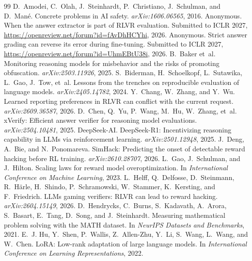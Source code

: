 \documentclass[10pt]{article}
\begin{document}
\begin{thebibliography}{99}\small
{} D.~Amodei, C.~Olah, J.~Steinhardt, P.~Christiano, J.~Schulman, and D.~Man\'e. Concrete problems in {AI} safety. \emph{arXiv:1606.06565}, 2016.
 Anonymous. When the answer extractor is part of {RLVR} evaluation. Submitted to ICLR 2027, \url{https://openreview.net/forum?id=fAvDhHCYhi}, 2026.
 Anonymous. Strict answer grading can reverse its error during fine-tuning. Submitted to ICLR 2027, \url{https://openreview.net/forum?id=UhmEBtU38i}, 2026.
 B.~Baker et~al. Monitoring reasoning models for misbehavior and the risks of promoting obfuscation. \emph{arXiv:2503.11926}, 2025.
 S.~Biderman, H.~Schoelkopf, L.~Sutawika, L.~Gao, J.~Tow, et~al. Lessons from the trenches on reproducible evaluation of language models. \emph{arXiv:2405.14782}, 2024.
 Y.~Chang, W.~Zhang, and Y.~Wu. Learned reporting preferences in {RLVR} can conflict with the current request. \emph{arXiv:2609.36587}, 2026.
 D.~Chen, Q.~Yu, P.~Wang, M.~Hu, W.~Zhang, et~al. {xVerify}: Efficient answer verifier for reasoning model evaluations. \emph{arXiv:2504.10481}, 2025.
 DeepSeek-AI. {DeepSeek-R1}: Incentivizing reasoning capability in {LLMs} via reinforcement learning. \emph{arXiv:2501.12948}, 2025.
 J.~Deng, A.~Bie, and N.~Ponomareva. {SimHack}: Predicting the onset of detectable reward hacking before {RL} training. \emph{arXiv:2610.28707}, 2026.
 L.~Gao, J.~Schulman, and J.~Hilton. Scaling laws for reward model overoptimization. In \emph{International Conference on Machine Learning}, 2023.
 L.~Helff, Q.~Delfosse, D.~Steinmann, R.~H\"arle, H.~Shindo, P.~Schramowski, W.~Stammer, K.~Kersting, and F.~Friedrich. {LLMs} gaming verifiers: {RLVR} can lead to reward hacking. \emph{arXiv:2604.15149}, 2026.
 D.~Hendrycks, C.~Burns, S.~Kadavath, A.~Arora, S.~Basart, E.~Tang, D.~Song, and J.~Steinhardt. Measuring mathematical problem solving with the {MATH} dataset. In \emph{NeurIPS Datasets and Benchmarks}, 2021.
 E.~J. Hu, Y.~Shen, P.~Wallis, Z.~Allen-Zhu, Y.~Li, S.~Wang, L.~Wang, and W.~Chen. {LoRA}: Low-rank adaptation of large language models. In \emph{International Conference on Learning Representations}, 2022.

\end{thebibliography}
\end{document}
